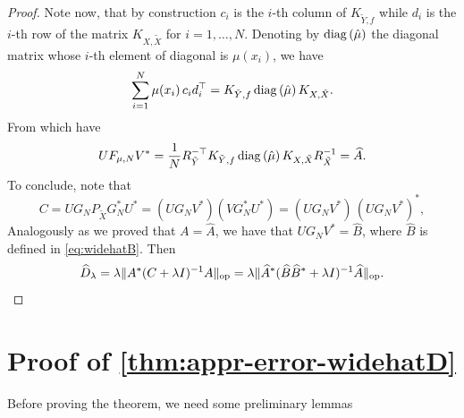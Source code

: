 \begin{proof}
{}
Note now, that by construction $c_i$ is the $i$-th column of $K_{\tilde{Y},f}$ while $d_i$ is the $i$-th row of the matrix $K_{X,\tilde{X}}$ for $i=1,\dots,N$. Denoting by $\operatorname{diag}\left(\hat{\mu}\right)$ the diagonal matrix whose $i$-th element of diagonal is $\mu(x_i)$, we have
$$ \sum_{i=1}^N \mu(x_i) \, c_i d_i^\top   = K_{\tilde{Y},f}\operatorname{diag}\left(\hat{\mu}\right)K_{X,\tilde{X}}.$$
From which have
$$
U F_{\mu, N} V^* = \frac{1}{N}R^{-\top}_{\tilde Y} K_{\tilde{Y},f}\operatorname{diag}\left(\hat{\mu}\right)K_{X,\tilde{X}} R^{-1}_{\tilde X} = \widehat{A}.
$$
To conclude, note that
$$C = U G_N P_{\tilde{X}} G_N^* U^* = (U G_N V^*) (V G_N^* U^*) = (U G_N V^*)\,(U G_N V^*)^*  ,$$
Analogously as we proved that $A = \widehat{A}$, we have that $U G_N V^* = \widehat{B}$, where $\widehat{B}$ is defined in \cref{eq:widehatB}. Then
$$\widehat{D}_\lambda = \lambda \|A^* (C + \lambda I)^{-1} A \|_{\mathrm{op}} = \lambda \|\widehat{A}^* (\widehat{B}\widehat{B}^* + \lambda I)^{-1} \widehat{A} \|_{\mathrm{op}}.$$
\end{proof}


\section{Proof of \cref{thm:appr-error-widehatD}}

Before proving the theorem, we need some preliminary lemmas

